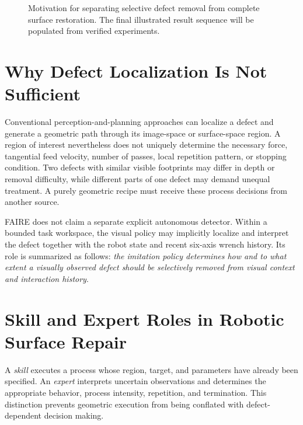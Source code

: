 \begin{figure}[t]
  \centering
  \caption{Motivation for separating selective defect removal from complete surface restoration. The final illustrated result sequence will be populated from verified experiments.}
  \label{fig:motivation}
\end{figure}

\section{Why Defect Localization Is Not Sufficient}
Conventional perception-and-planning approaches can localize a defect and generate a geometric path through its image-space or surface-space region. A region of interest nevertheless does not uniquely determine the necessary force, tangential feed velocity, number of passes, local repetition pattern, or stopping condition. Two defects with similar visible footprints may differ in depth or removal difficulty, while different parts of one defect may demand unequal treatment. A purely geometric recipe must receive these process decisions from another source.

FAIRE does not claim a separate explicit autonomous detector. Within a bounded task workspace, the visual policy may implicitly localize and interpret the defect together with the robot state and recent six-axis wrench history. Its role is summarized as follows: \emph{the imitation policy determines how and to what extent a visually observed defect should be selectively removed from visual context and interaction history}.

\section{Skill and Expert Roles in Robotic Surface Repair}
A \emph{skill} executes a process whose region, target, and parameters have already been specified. An \emph{expert} interprets uncertain observations and determines the appropriate behavior, process intensity, repetition, and termination. This distinction prevents geometric execution from being conflated with defect-dependent decision making.

